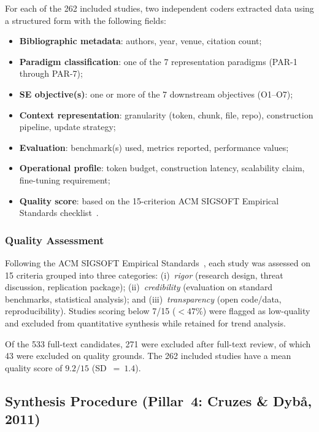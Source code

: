 For each of the 262 included studies, two independent coders extracted data
using a structured form with the following fields:

\begin{itemize}
  \item \textbf{Bibliographic metadata}: authors, year, venue, citation count;
  \item \textbf{Paradigm classification}: one of the 7 representation paradigms
  (PAR-1 through PAR-7);
  \item \textbf{SE objective(s)}: one or more of the 7 downstream objectives
  (O1--O7);
  \item \textbf{Context representation}: granularity (token, chunk, file, repo),
  construction pipeline, update strategy;
  \item \textbf{Evaluation}: benchmark(s) used, metrics reported, performance
  values;
  \item \textbf{Operational profile}: token budget, construction latency,
  scalability claim, fine-tuning requirement;
  \item \textbf{Quality score}: based on the 15-criterion ACM SIGSOFT Empirical
  Standards checklist~\cite{acm_empirical_standards}.
\end{itemize}

\subsubsection{Quality Assessment}

Following the ACM SIGSOFT Empirical Standards~\cite{acm_empirical_standards},
each study was assessed on 15 criteria grouped into three categories:
(i)~\emph{rigor} (research design, threat discussion, replication package);
(ii)~\emph{credibility} (evaluation on standard benchmarks, statistical
analysis); and (iii)~\emph{transparency} (open code/data, reproducibility).
Studies scoring below 7/15 ($< 47\%$) were flagged as low-quality and excluded
from quantitative synthesis while retained for trend analysis.

Of the 533 full-text candidates, 271 were excluded after full-text review, of
which 43 were excluded on quality grounds. The 262 included studies have a
mean quality score of $9.2/15$ (SD~$=~1.4$).

\subsection{Synthesis Procedure (Pillar~4: Cruzes \& Dyb{\aa}, 2011)}
\label{sec:synthesis}

